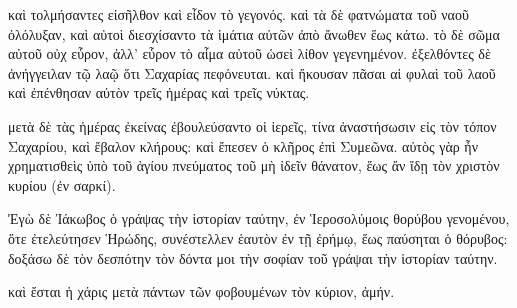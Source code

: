 \pend\pstart
καὶ τολμήσαντες εἰσῆλθον καὶ εἶδον τὸ γεγονός. καὶ τὰ δὲ φατνώματα τοῦ ναοῦ ὀλόλυξαν, καὶ αὐτοὶ διεσχίσαντο τὰ ἱμάτια αὐτῶν ἀπὸ ἄνωθεν ἕως κάτω. τὸ δὲ σῶμα αὐτοῦ οὐχ εὗρον, ἀλλ' εὗρον τὸ αἷμα αὐτοῦ ὡσεὶ λίθον γεγενημένον. ἐξελθόντες δὲ ἀνήγγειλαν τῷ λαῷ ὅτι Σαχαρίας πεφόνευται. καὶ ἤκουσαν πᾶσαι αἱ φυλαὶ τοῦ λαοῦ καὶ ἐπένθησαν αὐτὸν τρεῖς ἡμέρας καὶ τρεῖς νύκτας.

\pend\pstart
μετὰ δὲ τὰς ἡμέρας ἐκείνας ἐβουλεύσαντο οἱ ἱερεῖς, τίνα ἀναστήσωσιν εἰς τὸν τόπον Σαχαρίου, καὶ ἔβαλον κλήρους: καὶ ἔπεσεν ὁ κλῆρος ἐπὶ Συμεῶνα. αὐτὸς γὰρ ἦν χρηματισθεὶς ὑπὸ τοῦ ἁγίου πνεύματος τοῦ μὴ ἰδεῖν θάνατον, ἕως ἄν ἴδῃ τὸν χριστὸν κυρίου (ἐν σαρκί).

\pend\pstart
{}

\pend\setcounter{pstartL}{1}\pstart
Ἐγὼ δὲ Ἰάκωβος ὁ γράψας τὴν ἱστορίαν ταύτην, ἐν Ἱεροσολύμοις θορύβου γενομένου, ὅτε ἐτελεύτησεν Ἡρώδης, συνέστελλεν ἑαυτὸν ἐν τῇ ἐρήμῳ, ἕως παύσηται ὁ θόρυβος: δοξάσω δὲ τὸν δεσπότην τὸν δόντα μοι τὴν σοφίαν τοῦ γράψαι τὴν ἱστορίαν ταύτην.

\pend\pstart
καὶ ἔσται ἡ χάρις μετὰ πάντων τῶν φοβουμένων τὸν κύριον, ἀμήν.

\pend
